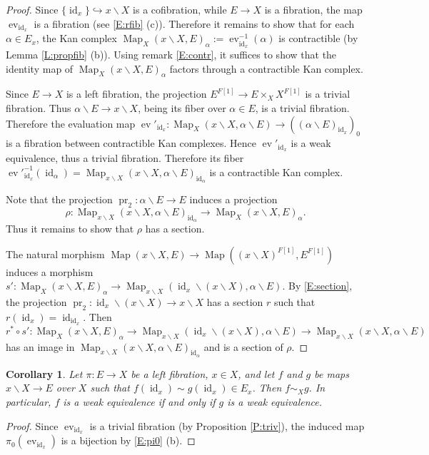 \documentclass[12pt]{amsart}
\theoremstyle{plain}
\newtheorem{Cor}[Thm]{Corollary}
\theoremstyle{definition}
\numberwithin{equation}{section}
\newcommand{\hra}{\hookrightarrow}
\newcommand{\bs}{\backslash}
\newcommand{\al}{\alpha}
\newcommand{\rl}[1]{Lemma \ref{L:#1}}
\newcommand{\rp}[1]{Proposition \ref{P:#1}}
\newcommand{\re}[1]{\ref{E:#1}}
\newcommand{\Map}{\operatorname{Map}}
\newcommand{\id}{\operatorname{id}}
\newcommand{\pr}{\operatorname{pr}}
\newcommand{\ev}{\operatorname{ev}}
\begin{document}
\begin{proof}
Since $\{\id_x\}\hra x\bs X$ is a cofibration, while $E\to X$ is a
fibration, the map $\ev_{\id_x}$ is a fibration (see \re{rfib}
(c)). Therefore it remains to show that for each $\al\in E_x$, the
Kan complex $\Map_X(x\bs X, E)_{\al}:=\ev_{\id_x}^{-1}(\al)$ is
contractible (by \rl{propfib} (b)). Using remark \re{contr}, it
suffices to  show that the identity map of $\Map_X(x\bs X,
E)_{\al}$ factors through a contractible Kan complex.

 Since $E\to X$ is a left fibration, the
projection $E^{F[1]}\to E\times_X X^{F[1]}$ is a trivial
fibration. Thus $\al\bs E\to x\bs X$, being its fiber over $\al\in
E$, is a trivial fibration. Therefore the evaluation map
$\ev'_{\id_x}:\Map_X(x\bs X, \al\bs E)\to ((\al\bs E)_{\id_x})_0$
is a fibration between contractible Kan complexes. Hence
$\ev'_{\id_x}$ is a weak equivalence, thus a trivial fibration.
Therefore its fiber $\ev'^{-1}_{\id_x}(\id_{\al})=\Map_{x\bs
X}(x\bs X,\al\bs E)_{\id_{\al}}$ is a contractible Kan complex.

Note that the projection $\pr_2:\al\bs E\to E$ induces a projection
\[
\rho:\Map_{x\bs X}(x\bs X,\al\bs E)_{\id_{\al}}\to \Map_X(x\bs X,
E)_{\al}.
\]
Thus it remains to show that $\rho$ has a section. 

The natural morphism $\Map(x\bs X, E)\to \Map((x\bs X)^{F[1]},
E^{F[1]})$ induces a morphism $s':\Map_X(x\bs X, E)_{\al}\to
\Map_{x\bs X}(\id_x\bs (x\bs X), \al\bs E)$. By \re{section}, the
projection $\pr_2:\id_x\bs(x\bs X)\to x\bs X$ has a section $r$
such that $r(\id_x)=\id_{\id_x}$. Then
\[
r^*\circ s': \Map_X(x\bs X, E)_{\al}\to \Map_{x\bs X}(\id_x\bs
(x\bs X), \al\bs E)\to\Map_{x\bs X}(x\bs X, \al\bs E)
\]
has an image in $\Map_{x\bs X}(x\bs X,\al\bs E)_{\id_{\al}}$ and
is a section of $\rho$.
\end{proof}

\begin{Cor} \label{C:trfib}
Let $\pi:E\to X$ be a left fibration, $x\in X$,  and let $f$ and
$g$ be maps $x\bs X\to E$ over $X$ such that $f(\id_x)\sim
g(\id_x)\in E_x$. Then $f\sim_X g$. In particular, $f$ is a weak
equivalence if and only if $g$ is a weak equivalence.
\end{Cor}

\begin{proof}
Since $\ev_{\id_x}$ is a trivial fibration (by \rp{triv}), the
induced map $\pi_0(\ev_{\id_x})$ is a bijection by \re{pi0} (b).
\end{proof}
\end{document}
